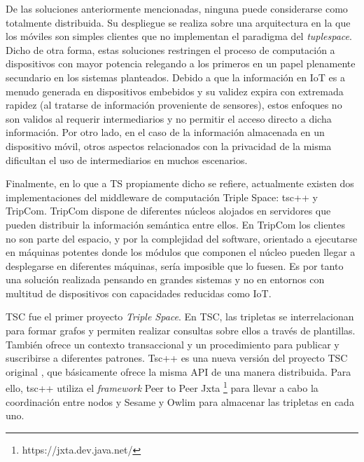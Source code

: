 

De las soluciones anteriormente mencionadas, ninguna puede considerarse como totalmente distribuida. Su despliegue se realiza sobre una arquitectura en la que los móviles son simples clientes que no implementan el paradigma del \textit{tuplespace}. Dicho de otra forma, estas soluciones restringen el proceso de computación a dispositivos con mayor potencia relegando a los primeros en un papel plenamente secundario en los sistemas planteados. Debido a que la información en IoT es a menudo generada en dispositivos embebidos y su validez expira con extremada rapidez (al tratarse de información proveniente de sensores), estos enfoques no son validos al requerir intermediarios y no permitir el acceso directo a dicha información. Por otro lado, en el caso de la información almacenada en un dispositivo móvil, otros aspectos relacionados con la privacidad de la misma dificultan el uso de intermediarios en muchos escenarios.

Finalmente, en lo que a TS propiamente dicho se refiere, actualmente existen dos implementaciones del middleware de computación Triple Space: tsc++ y TripCom. TripCom\cite{tripcom_2011} dispone de diferentes núcleos alojados en servidores que pueden distribuir la información semántica entre ellos. En TripCom los clientes no son parte del espacio, y por la complejidad del software, orientado a ejecutarse en máquinas potentes donde los módulos que componen el núcleo pueden llegar a desplegarse en diferentes máquinas, sería imposible que lo fuesen. Es por tanto una solución realizada pensando en grandes sistemas y no en entornos con multitud de dispositivos con capacidades reducidas como IoT.

TSC fue el primer proyecto \textit{Triple Space}. En TSC, las tripletas se interrelacionan para formar grafos y permiten realizar consultas sobre ellos a través de plantillas. También ofrece un contexto transaccional y un procedimiento para publicar y suscribirse a diferentes patrones. Tsc++ \cite{krummenacher_open_2009} es una nueva versión del proyecto TSC original \cite{fensel_triple-space_2004}, que básicamente ofrece la misma API de una manera distribuida. Para ello, tsc++ utiliza el \textit{framework} Peer to Peer Jxta \footnote{https://jxta.dev.java.net/} para llevar a cabo la coordinación entre nodos y Sesame \cite{broekstra_sesame:_2002} y Owlim \cite{kiryakov_owlimpragmatic_2005} para almacenar las tripletas en cada uno.

